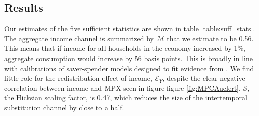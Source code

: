 \documentclass[titlepage]{\econtex}\newcommand{\texname}{ConsumptionHeterogeneity}
\begin{document}
\subsection{Results}
Our estimates of the five sufficient statistics are shown in table \ref{table:suff_stats}. The aggregate income channel is summarized by $\mathcal{M}$ that we estimate to be 0.56. This means that if income for all households in the economy increased by 1\%, aggregate consumption would increase by 56 basis points. This is broadly in line with calibrations of saver-spender models designed to fit evidence from \cite{campbell_consumption_1989}. We find little role for the redistribution effect of income, $\mathcal{E}_Y$, despite the clear negative correlation between income and MPX seen in figure figure \ref{fig:MPCAuclert}. $\mathcal{S}$, the Hicksian scaling factor, is 0.47, which reduces the size of the intertemporal substitution channel by close to a half.
\end{document}
